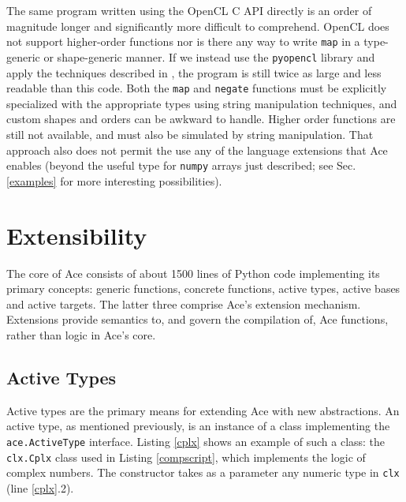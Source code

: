 \documentclass[9pt,preprint]{sigplanconf}
\begin{document}
The same program written using the OpenCL C API directly is an order of magnitude longer and significantly more difficult to comprehend. OpenCL does not support higher-order functions nor is there any way to write \verb|map| in a type-generic or shape-generic manner. If we instead use the \verb|pyopencl| library and apply the techniques described in \cite{klockner2011pycuda}, the program is still twice as large and less readable than this code. Both the \verb|map| and \verb|negate| functions must be explicitly specialized with the appropriate types using string manipulation techniques, and custom shapes and orders can be awkward to handle. Higher order functions are still not available, and must also be simulated by string manipulation. That approach also does not permit the use any of the language extensions that Ace enables (beyond the useful type for \verb|numpy| arrays just described; see Sec. \ref{examples} for more interesting possibilities).


\section{Extensibility}\label{att}
The core of Ace consists of about 1500 lines of Python code implementing its primary concepts: generic functions, concrete functions, active types, active bases and active targets.  The latter three comprise Ace's extension mechanism. Extensions provide semantics to, and govern the compilation of, Ace functions, rather than logic in Ace's core. %

\subsection{Active Types}\label{atypes}
Active types are the primary means for extending Ace with new abstractions. An active type, as mentioned previously, is an instance of a class implementing the \verb|ace.ActiveType| interface. Listing \ref{cplx} shows an example of such a class: the \verb|clx.Cplx| class used in Listing \ref{compscript}, which implements the logic of complex numbers. The constructor takes as a parameter any numeric type in \verb|clx| (line \ref{cplx}.2). 
\end{document}
